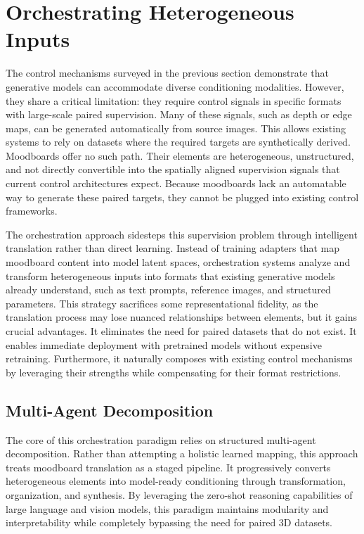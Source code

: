 \section{Orchestrating Heterogeneous Inputs}

The control mechanisms surveyed in the previous section demonstrate that generative models can accommodate diverse conditioning modalities. However, they share a critical limitation: they require control signals in specific formats with large-scale paired supervision. Many of these signals, such as depth or edge maps, can be generated automatically from source images. This allows existing systems to rely on datasets where the required targets are synthetically derived. Moodboards offer no such path. Their elements are heterogeneous, unstructured, and not directly convertible into the spatially aligned supervision signals that current control architectures expect. Because moodboards lack an automatable way to generate these paired targets, they cannot be plugged into existing control frameworks.

The orchestration approach sidesteps this supervision problem through intelligent translation rather than direct learning. Instead of training adapters that map moodboard content into model latent spaces, orchestration systems analyze and transform heterogeneous inputs into formats that existing generative models already understand, such as text prompts, reference images, and structured parameters. This strategy sacrifices some representational fidelity, as the translation process may lose nuanced relationships between elements, but it gains crucial advantages. It eliminates the need for paired datasets that do not exist. It enables immediate deployment with pretrained models without expensive retraining. Furthermore, it naturally composes with existing control mechanisms by leveraging their strengths while compensating for their format restrictions.

\subsection{Multi-Agent Decomposition}

The core of this orchestration paradigm relies on structured multi-agent decomposition. Rather than attempting a holistic learned mapping, this approach treats moodboard translation as a staged pipeline. It progressively converts heterogeneous elements into model-ready conditioning through transformation, organization, and synthesis. By leveraging the zero-shot reasoning capabilities of large language and vision models, this paradigm maintains modularity and interpretability while completely bypassing the need for paired 3D datasets.

